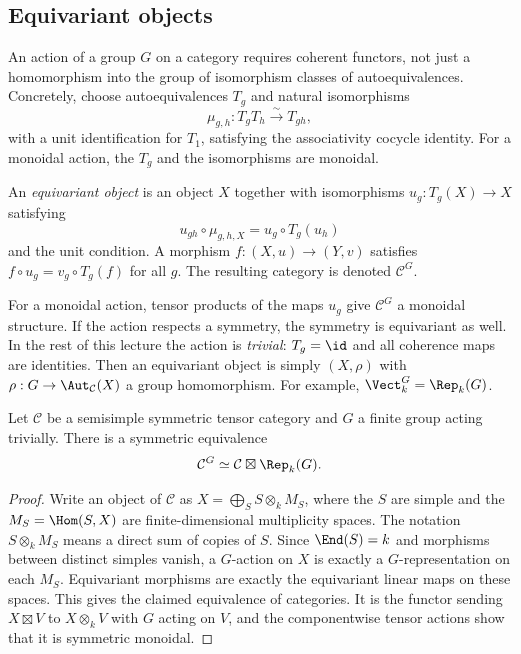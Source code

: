 \subsection{Equivariant objects}

An action of a group $G$ on a category requires coherent functors,
not just a homomorphism into the group of isomorphism classes of
autoequivalences. Concretely, choose autoequivalences $T_g$ and
natural isomorphisms
\[
 \mu_{g,h}:T_gT_h\xrightarrow{\sim}T_{gh},
\]
with a unit identification for $T_1$, satisfying the associativity
cocycle identity. For a monoidal action, the $T_g$ and the
isomorphisms are monoidal.

\begin{definition}
An \emph{equivariant object} is an object $X$ together with
isomorphisms $u_g:T_g(X)\to X$ satisfying
\[
 u_{gh}\circ\mu_{g,h,X}=u_g\circ T_g(u_h)
\]
and the unit condition. A morphism $f:(X,u)\to(Y,v)$ satisfies
$f\circ u_g=v_g\circ T_g(f)$ for all $g$. The resulting category
is denoted $\mathcal C^G$.
\end{definition}

For a monoidal action, tensor products of the maps $u_g$ give
$\mathcal C^G$ a monoidal structure. If the action respects a
symmetry, the symmetry is equivariant as well. In the rest of this
lecture the action is \emph{trivial}: $T_g=\id$ and all coherence
maps are identities. Then an equivariant object is simply
$(X,\rho)$ with $\rho:G\to\Aut_{\mathcal C}(X)$ a group
homomorphism. For example, $\Vect_k^G=\Rep_k(G)$.

\begin{proposition}\label{prop:lec18-equivariant-product}
Let $\mathcal C$ be a semisimple symmetric tensor category and $G$
a finite group acting trivially. There is a symmetric equivalence
\[
 \mathcal C^G\simeq\mathcal C\boxtimes\Rep_k(G).
\]
\end{proposition}
\begin{proof}
Write an object of $\mathcal C$ as
$X=\bigoplus_S S\otimes_k M_S$, where the $S$ are simple and the
$M_S=\Hom(S,X)$ are finite-dimensional multiplicity spaces. The
notation $S\otimes_k M_S$ means a direct sum of copies of $S$.
Since $\End(S)=k$ and morphisms between distinct simples vanish, a
$G$-action on $X$ is exactly a $G$-representation on each $M_S$.
Equivariant morphisms are exactly the equivariant linear maps on
these spaces. This gives the claimed equivalence of categories.
It is the functor sending $X\boxtimes V$ to $X\otimes_k V$ with
$G$ acting on $V$, and the componentwise tensor actions show that
it is symmetric monoidal.
\end{proof}

